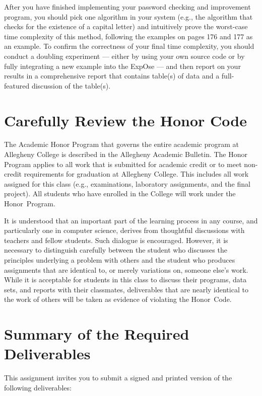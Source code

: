 After you have finished implementing your password checking and improvement program, you should pick one algorithm in
your system (e.g., the algorithm that checks for the existence of a capital letter) and intuitively prove the worst-case
time complexity of this method, following the examples on pages 176 and 177 as an example. To confirm the correctness of
your final time complexity, you should conduct a doubling experiment --- either by using your own source code or by
fully integrating a new example into the {\sc ExpOse} --- and then report on your results in a comprehensive report that
contains table(s) of data and a full-featured discussion of the table(s).

\section*{Carefully Review the Honor Code}

The Academic Honor Program that governs the entire academic program at Allegheny College is described in the Allegheny
Academic Bulletin. The Honor Program applies to all work that is submitted for academic credit or to meet non-credit
requirements for graduation at Allegheny College. This includes all work assigned for this class (e.g., examinations,
laboratory assignments, and the final project). All students who have enrolled in the College will work under the
\mbox{Honor Program}.

\noindent It is understood that an important part of the learning process in any course, and particularly one in
computer science, derives from thoughtful discussions with teachers and fellow students. Such dialogue is encouraged.
However, it is necessary to distinguish carefully between the student who discusses the principles underlying a problem
with others and the student who produces assignments that are identical to, or merely variations on, someone else's
work. While it is acceptable for students in this class to discuss their programs, data sets, and reports with their
classmates, deliverables that are nearly identical to the work of others will be taken as evidence of violating the
\mbox{Honor Code}.

\section*{Summary of the Required Deliverables}

This assignment invites you to submit a signed and printed version of the following deliverables:

